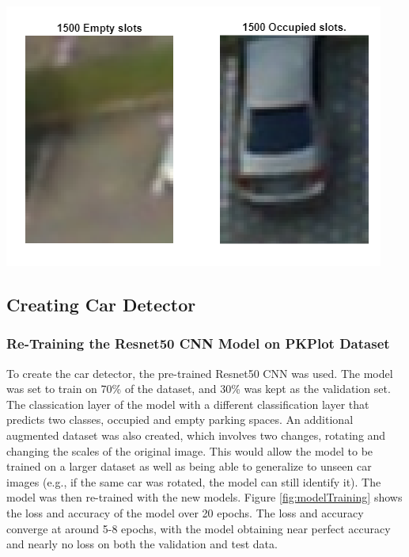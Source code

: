 \documentclass[man]{apa7}
\begin{document}
\begin{minipage}{\linewidth}
  \includegraphics[height=\textheight/4,width=\textwidth/2]{figures/pkplot2.png}
  \label{fig:pkplot2}
\end{minipage}


\subsection{Creating Car Detector}

\subsubsection{Re-Training the Resnet50 CNN Model on PKPlot Dataset}
To create the car detector, the pre-trained Resnet50 CNN was used. The model was set to train on 70\% of the dataset, and 30\% was kept as the validation set. The classication layer of the model with a different classification layer that predicts two classes, occupied and empty parking spaces. An additional augmented dataset was also created, which involves two changes, rotating and changing the scales of the original image. This would allow the model to be trained on a larger dataset as well as being able to generalize to unseen car images (e.g., if the same car was rotated, the model can still identify it). The model was then re-trained with the new models. Figure \ref{fig:modelTraining} shows the loss and accuracy of the model over 20 epochs. The loss and accuracy converge at around 5-8 epochs, with the model obtaining near perfect accuracy and nearly no loss on both the validation and test data.
\end{document}
